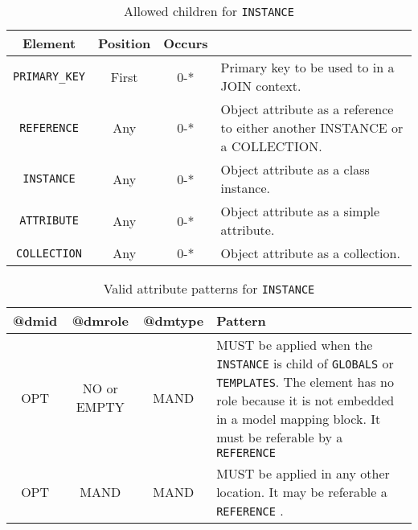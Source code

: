  
\begin{table}[!htbp]
\small
\centering
\begin{tabulary}{\linewidth}{|c |c |c|J|}
    \hline 
        \textbf{Element} &
        \textbf{Position} &
        \textbf{Occurs} &
        \\
    \hline      \hline  
        \texttt{PRIMARY\_KEY}  &        
        First &           
        0-* &
        Primary key to be used to in a JOIN context.\\
    \hline    
        \texttt{REFERENCE}  &        
        Any &           
        0-* &
         Object attribute as a reference to either another INSTANCE or a COLLECTION.\\
    \hline    
        \texttt{INSTANCE} &           
        Any &           
        0-* &
         Object attribute as a class instance. \\
    \hline    
        \texttt{ATTRIBUTE} &           
        Any &           
        0-* &
       Object attribute as a simple attribute. \\
    \hline    
        \texttt{COLLECTION} &           
        Any &           
        0-* &
         Object attribute  as a collection.\\
    \hline 
\end{tabulary}
     \caption{Allowed children for \texttt{INSTANCE}} 
     \label{tbl:instance-chilren}
\end{table}
 
\begin{table}[!htbp]
\small
\centering
\begin{tabulary}{\linewidth}{|c|c|c|J|}
    \hline 
        \textbf{@dmid} &
        \textbf{@dmrole} &
        \textbf{@dmtype} &
        \textbf{Pattern}\\
    \hline      \hline  
        OPT &           
        NO or EMPTY&           
        MAND &           
        MUST be applied when the  \texttt{INSTANCE} is child of \texttt{GLOBALS} or \texttt{TEMPLATES}. The element has no role because it is not embedded in a model mapping block. It must be referable by a \texttt{REFERENCE}  \\
    \hline   
        OPT &           
        MAND &           
        MAND &           
        MUST be applied in any other location. It may be referable a \texttt{REFERENCE} . \\
   \hline 
\end{tabulary}
     \caption{Valid attribute patterns for  \texttt{INSTANCE}} 
     \label{tbl:instance-pattern}
 \end{table}       
\newpage

 
